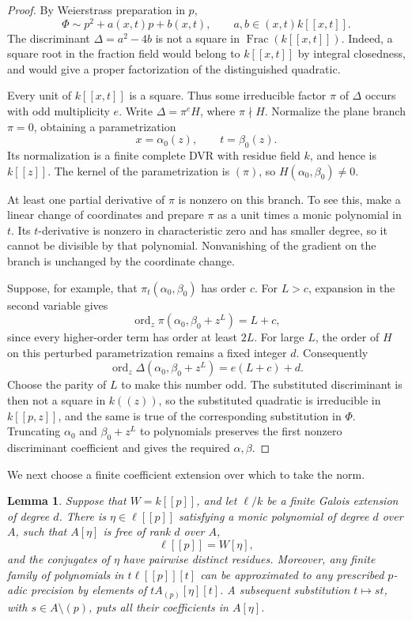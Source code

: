 \documentclass[11pt]{amsart}
\newtheorem{lemma}[theorem]{Lemma}
\theoremstyle{remark}
\DeclareMathOperator{\Frac}{Frac}
\DeclareMathOperator{\ord}{ord}
\begin{document}
\begin{proof}
By Weierstrass preparation in $p$,
\[
 \Phi\sim p^2+a(x,t)p+b(x,t),\qquad
 a,b\in(x,t)k[[x,t]].
\]
The discriminant $\Delta=a^2-4b$ is not a square in
$\Frac(k[[x,t]])$. Indeed, a square root in the fraction field
would belong to $k[[x,t]]$ by integral closedness, and would give
a proper factorization of the distinguished quadratic.

Every unit of $k[[x,t]]$ is a square. Thus some irreducible factor
$\pi$ of $\Delta$ occurs with odd multiplicity $e$. Write
$\Delta=\pi^eH$, where $\pi\nmid H$. Normalize the plane branch
$\pi=0$, obtaining a parametrization
\[
 x=\alpha_0(z),\qquad t=\beta_0(z).
\]
Its normalization is a finite complete DVR with residue field $k$,
and hence is $k[[z]]$. The kernel of the parametrization is $(\pi)$,
so $H(\alpha_0,\beta_0)\ne0$.

At least one partial derivative of $\pi$ is nonzero on this branch.
To see this, make a linear change of coordinates and prepare $\pi$
as a unit times a monic polynomial in $t$. Its $t$-derivative is
nonzero in characteristic zero and has smaller degree, so it cannot
be divisible by that polynomial. Nonvanishing of the gradient on
the branch is unchanged by the coordinate change.

Suppose, for example, that $\pi_t(\alpha_0,\beta_0)$ has order $c$.
For $L>c$, expansion in the second variable gives
\[
 \ord_z\pi(\alpha_0,\beta_0+z^L)=L+c,
\]
since every higher-order term has order at least $2L$. For large
$L$, the order of $H$ on this perturbed parametrization remains
a fixed integer $d$. Consequently
\[
 \ord_z\Delta(\alpha_0,\beta_0+z^L)=e(L+c)+d.
\]
Choose the parity of $L$ to make this number odd. The substituted
discriminant is then not a square in $k((z))$, so the substituted
quadratic is irreducible in $k[[p,z]]$, and the same is true of
the corresponding substitution in $\Phi$.
Truncating $\alpha_0$ and $\beta_0+z^L$ to polynomials preserves
the first nonzero discriminant coefficient and gives the required
$\alpha,\beta$.
\end{proof}

We next choose a finite coefficient extension over which to take
the norm.

\begin{lemma}\label{lem:coefficientmodel}
Suppose that $W=k[[p]]$, and let $\ell/k$ be a finite Galois
extension of degree $d$. There is $\eta\in\ell[[p]]$ satisfying
a monic polynomial of degree $d$ over $A$, such that
$A[\eta]$ is free of rank $d$ over $A$,
\[
 \ell[[p]]=W[\eta],
\]
and the conjugates of $\eta$ have pairwise distinct residues.
Moreover, any finite family of polynomials in $t\ell[[p]][t]$
can be approximated to any prescribed $p$-adic precision by
elements of $tA_{(p)}[\eta][t]$. A subsequent substitution
$t\mapsto st$, with $s\in A\setminus(p)$, puts all their
coefficients in $A[\eta]$.
\end{lemma}
\end{document}
